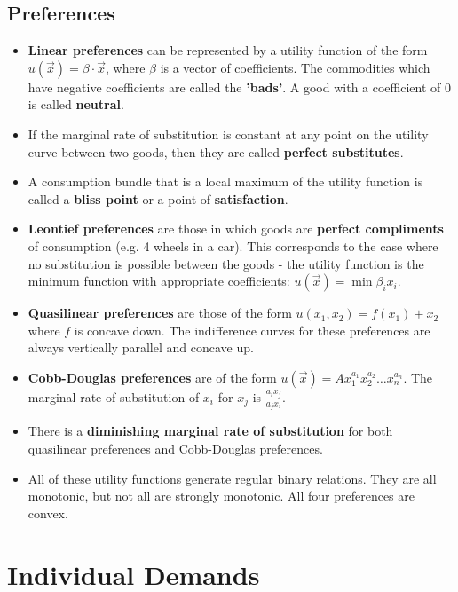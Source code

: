\documentclass[a4paper]{article}
\begin{document}
\subsection{Preferences}
\begin{itemize}
    \item \textbf{Linear preferences} can be represented by a utility function of the form $u(\vec{x}) = \beta \cdot \vec{x}$, where $\beta$ is a vector of coefficients. The commodities which have negative coefficients are called the \textbf{'bads'}. A good with a coefficient of 0 is called \textbf{neutral}.
    \item If the marginal rate of substitution is constant at any point on the utility curve between two goods, then they are called \textbf{perfect substitutes}.
    \item A consumption bundle that is a local maximum of the utility function is called a \textbf{bliss point} or a point of \textbf{satisfaction}.
    \item \textbf{Leontief preferences} are those in which goods are \textbf{perfect compliments} of consumption (e.g. 4 wheels in a car). This corresponds to the case where no substitution is possible between the goods - the utility function is the minimum function with appropriate coefficients: $u(\vec{x}) = \min{\beta_i x_i}$. 
    \item \textbf{Quasilinear preferences} are those of the form $u(x_1, x_2) = f(x_1) + x_2$ where $f$ is concave down. The indifference curves for these preferences are always vertically parallel and concave up.
    \item \textbf{Cobb-Douglas preferences} are of the form $u(\vec{x}) = Ax_1^{a_1}x_2^{a_2}\hdots x_n^{a_n}$. The marginal rate of substitution of $x_i$ for $x_j$ is $\frac{a_i x_j}{a_j x_i}$. 
    \item There is a \textbf{diminishing marginal rate of substitution} for both quasilinear preferences and Cobb-Douglas preferences.
    \item All of these utility functions generate regular binary relations. They are all monotonic, but not all are strongly monotonic. All four preferences are convex.
\end{itemize}

\section{Individual Demands}
\end{document}
